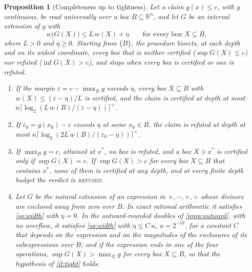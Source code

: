 \documentclass[preprint,11pt,a4paper]{elsarticle}
\newtheorem{proposition}{Proposition}
\theoremstyle{definition}
\newcommand{\R}{\mathbb{R}}
\newcommand{\verdict}[1]{\textup{\textsc{#1}}}
\newcommand{\REFS}{\verdict{refused}}
\begin{document}
\begin{proposition}[Completeness up to tightness]\label{prop:complete}
Let a claim $g(x)\le c$, with $g$ continuous, be read universally over a box $B\subseteq\R^n$, and let $G$ be an interval extension of $g$ with
\begin{equation}\label{eq:width}
w\bigl(G(X)\bigr)\le L\,w(X)+\eta\qquad\text{for every box }X\subseteq B,
\end{equation}
where $L>0$ and $\eta\ge0$. Starting from $\{B\}$, the procedure bisects, at each depth and on its widest coordinate, every box that is neither certified ($\sup G(X)\le c$) nor refuted ($\inf G(X)>c$), and stops when every box is certified or one is refuted.
\begin{enumerate}\renewcommand{\theenumi}{(\roman{enumi})}\renewcommand{\labelenumi}{\theenumi}
\item\label{it:robust} If the margin $\varepsilon=c-\max_B g$ exceeds $\eta$, every box $X\subseteq B$ with $w(X)\le(\varepsilon-\eta)/L$ is certified, and the claim is certified at depth at most $n\lceil\log_2(L\,w(B)/(\varepsilon-\eta))\rceil^{+}$.
\item\label{it:false} If $\varepsilon_0=g(x_0)-c$ exceeds $\eta$ at some $x_0\in B$, the claim is refuted at depth at most $n\lceil\log_2(2L\,w(B)/(\varepsilon_0-\eta))\rceil^{+}$.
\item\label{it:tight} If $\max_B g=c$, attained at $x^*$, no box is refuted, and a box $X\ni x^*$ is certified only if $\sup G(X)=c$. If $\sup G(X)>c$ for every box $X\subseteq B$ that contains $x^*$, none of them is certified at any depth, and at every finite depth budget the verdict is \REFS.
\item\label{it:arith} Let $G$ be the natural extension of an expression in $+,-,\times,\div$ whose divisors are enclosed away from zero over $B$. In exact rational arithmetic it satisfies \cref{eq:width} with $\eta=0$. In the outward-rounded doubles of \cref{prop:outward}, with no overflow, it satisfies \cref{eq:width} with $\eta\le C\,u$, $u=2^{-53}$, for a constant $C$ that depends on the expression and on the magnitudes of the enclosures of its subexpressions over $B$; and if the expression ends in one of the four operations, $\sup G(X)>\max_X g$ for every box $X\subseteq B$, so that the hypothesis of \ref{it:tight} holds.
\end{enumerate}
\end{proposition}
\end{document}
